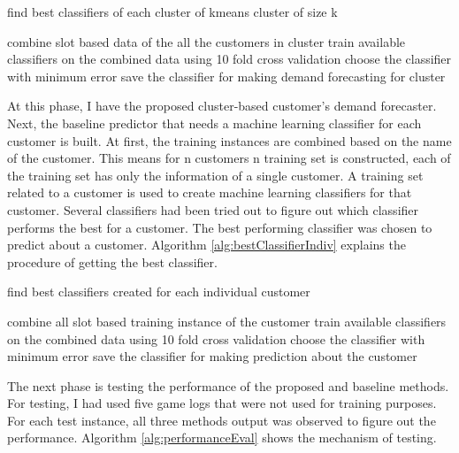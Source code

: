 \begin{algorithm} [!h]
\caption{find best classifiers of each cluster of kmeans cluster of size k}
\begin{algorithmic} [1]
    \STATE combine slot based data of the all the customers in cluster
    \STATE train available classifiers on the combined data using 10 fold cross validation
    \STATE choose the classifier with minimum error
    \STATE save the classifier for making demand forecasting for cluster
\ENDFOR 
\end{algorithmic}
\label{alg:bestClassifierForCluster}
\end{algorithm}


At this phase, I have the proposed cluster-based customer's demand forecaster. Next, the baseline predictor that needs a machine learning classifier for each customer is built. At first, the training instances are combined based on the name of the customer. This means for n customers n training set is constructed, each of the training set has only the information of a single customer. A training set related to a customer is used to create machine learning classifiers for that customer. Several classifiers had been tried out to figure out which classifier performs the best for a customer. The best performing classifier was chosen to predict about a customer. Algorithm \ref{alg:bestClassifierIndiv} explains the procedure of getting the best classifier.

\begin{algorithm}[!h]
\caption{find best classifiers created for each individual customer}
\begin{algorithmic} [1]
    \STATE combine all slot based training instance of the customer
    \STATE train available classifiers on the combined data using 10 fold cross validation
    \STATE choose the classifier with minimum error
    \STATE save the classifier for making prediction about the customer
\ENDFOR 
\end{algorithmic}
\label{alg:bestClassifierIndiv}
\end{algorithm}

The next phase is testing the performance of the proposed and baseline methods. For testing, I had used five game logs that were not used for training purposes. For each test instance, all three methods output was observed to figure out the performance. Algorithm \ref{alg:performanceEval} shows the mechanism of testing.

